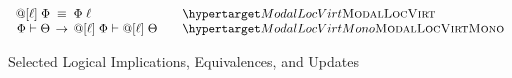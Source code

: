 \begin{figure}
  \[
  \begin{array}{r@{\;}c@{\;}lll}
\modaldef\ell\Phi
& \logequiv &
\modaldefunfold\ell\Phi
&& \TirNameStyle{ModalLocVirt}
\\

\Phi \vdash \Theta & \rightarrow & \modaldef\ell\Phi \vdash \modaldef\ell\Theta&& \TirNameStyle{ModalLocVirtMono}
  \end{array}
  \]

\caption{Selected Logical Implications, Equivalences, and Updates}
\label{fig:laws}
\end{figure}
